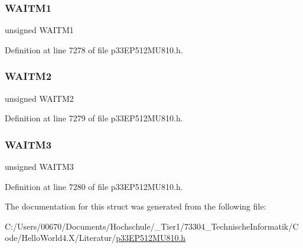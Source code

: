 \subsubsection{\texorpdfstring{W\+A\+I\+T\+M1}{WAITM1}}
{\footnotesize\ttfamily unsigned W\+A\+I\+T\+M1}



Definition at line 7278 of file p33\+E\+P512\+M\+U810.\+h.

\mbox{\label{structtag_p_m_m_o_d_e_b_i_t_s_ad7f77d6f0db3dcef90dc51ddc92bb0ac}} 
\subsubsection{\texorpdfstring{W\+A\+I\+T\+M2}{WAITM2}}
{\footnotesize\ttfamily unsigned W\+A\+I\+T\+M2}



Definition at line 7279 of file p33\+E\+P512\+M\+U810.\+h.

\mbox{\label{structtag_p_m_m_o_d_e_b_i_t_s_a40b07e066e9763a7da1a8aef1b87fc93}} 
\subsubsection{\texorpdfstring{W\+A\+I\+T\+M3}{WAITM3}}
{\footnotesize\ttfamily unsigned W\+A\+I\+T\+M3}



Definition at line 7280 of file p33\+E\+P512\+M\+U810.\+h.



The documentation for this struct was generated from the following file\+:\begin{DoxyCompactItemize}
\item 
C\+:/\+Users/00670/\+Documents/\+Hochschule/\+\_\+\+Tier1/73304\+\_\+\+Technische\+Informatik/\+Code/\+Hello\+World4.\+X/\+Literatur/\hyperlink{p33_e_p512_m_u810_8h}{p33\+E\+P512\+M\+U810.\+h}\end{DoxyCompactItemize}
